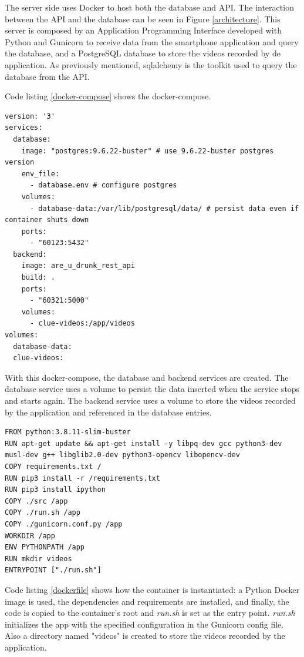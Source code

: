 The server side uses Docker to host both the database and API. The interaction between the API and the database can be seen in Figure \ref{architecture}. This server is composed by an Application Programming Interface developed with Python and Gunicorn to receive data from the smartphone application and query the database, and a PostgreSQL database to store the videos recorded by de application. As previously mentioned, sqlalchemy is the toolkit used to query the database from the API.

Code listing \ref{docker-compose} shows the docker-compose.

\begin{lstlisting}[language=docker-compose-2, label={docker-compose}, caption={docker-compose}, captionpos=b]
version: '3'
services:
  database:
    image: "postgres:9.6.22-buster" # use 9.6.22-buster postgres version
    env_file:
      - database.env # configure postgres
    volumes:
      - database-data:/var/lib/postgresql/data/ # persist data even if container shuts down
    ports:
      - "60123:5432"
  backend:
    image: are_u_drunk_rest_api
    build: .
    ports:
      - "60321:5000"
    volumes:
      - clue-videos:/app/videos
volumes:
  database-data:
  clue-videos:
\end{lstlisting}

With this docker-compose, the database and backend services are created. The database service uses a volume to persist the data inserted when the service stops and starts again. The backend service uses a volume to store the videos recorded by the application and referenced in the database entries.


\begin{lstlisting}[language=docker, label={dockerfile}, caption={Dockerfile}, captionpos=b]
FROM python:3.8.11-slim-buster
RUN apt-get update && apt-get install -y libpq-dev gcc python3-dev musl-dev g++ libglib2.0-dev python3-opencv libopencv-dev
COPY requirements.txt /
RUN pip3 install -r /requirements.txt
RUN pip3 install ipython
COPY ./src /app
COPY ./run.sh /app
COPY ./gunicorn.conf.py /app
WORKDIR /app
ENV PYTHONPATH /app
RUN mkdir videos
ENTRYPOINT ["./run.sh"]
\end{lstlisting}

Code listing \ref{dockerfile} shows how the container is instantiated: a Python Docker image is used, the dependencies and requirements are installed, and finally, the code is copied to the container's root and \textit{run.sh} is set as the entry point. \textit{run.sh} initializes the app with the specified configuration in the Gunicorn config file. Also a directory named "videos" is created to store the videos recorded by the application.

